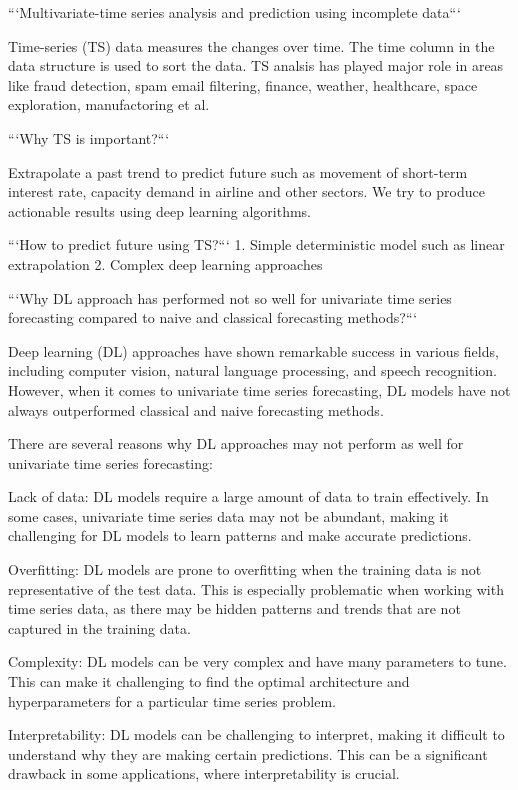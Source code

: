```Multivariate-time series analysis and prediction using incomplete data```

Time-series (TS) data measures the changes over time. The time column in the data structure is used to sort the data.
TS analsis has played major role in areas like fraud detection, spam email filtering, finance, weather, healthcare, space exploration, manufactoring et al.

```Why TS is important?```

Extrapolate a past trend to predict future such as movement of short-term interest rate, capacity demand in airline and other sectors.
We try to produce actionable results using deep learning algorithms.

```How to predict future using TS?```
1. Simple deterministic model such as linear extrapolation
2. Complex deep learning approaches

```Why DL approach has performed not so well for univariate time series forecasting compared to naive and classical forecasting methods?```

Deep learning (DL) approaches have shown remarkable success in various fields, including computer vision, natural language processing, and speech recognition. However, when it comes to univariate time series forecasting, DL models have not always outperformed classical and naive forecasting methods.

There are several reasons why DL approaches may not perform as well for univariate time series forecasting:

Lack of data: DL models require a large amount of data to train effectively. In some cases, univariate time series data may not be abundant, making it challenging for DL models to learn patterns and make accurate predictions.

Overfitting: DL models are prone to overfitting when the training data is not representative of the test data. This is especially problematic when working with time series data, as there may be hidden patterns and trends that are not captured in the training data.

Complexity: DL models can be very complex and have many parameters to tune. This can make it challenging to find the optimal architecture and hyperparameters for a particular time series problem.

Interpretability: DL models can be challenging to interpret, making it difficult to understand why they are making certain predictions. This can be a significant drawback in some applications, where interpretability is crucial.

